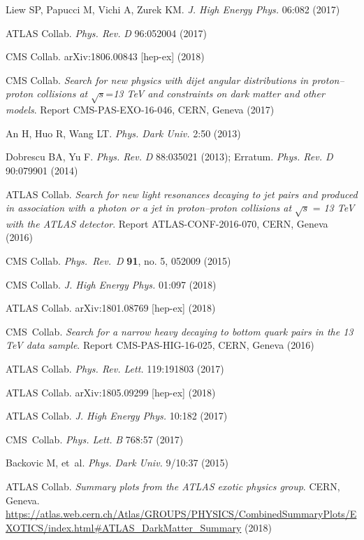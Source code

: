 \documentclass{ar-1col}
\begin{document}
{\begin{thebibliography}{175}
Liew SP, Papucci M, Vichi A, Zurek KM. \textit{J. High Energy Phys.} 06:082 (2017)

{ATLAS Collab}. \textit{Phys. Rev.} \textit{D} 96:052004 (2017)
  
{CMS Collab.} arXiv:1806.00843 [hep-ex] (2018) 

CMS Collab.\textit{ Search for new physics with dijet angular distributions in proton--proton collisions at} $\sqrt{s}$=\textit{13 TeV and constraints on dark matter and other models}. Report CMS-PAS-EXO-16-046, CERN, Geneva (2017)

An H, Huo R, Wang LT. \textit{Phys. Dark Univ.} 2:50 (2013)

Dobrescu BA, Yu F. \textit{Phys. Rev.} \textit{D} 88:035021 (2013); Erratum. \textit{Phys. Rev. D} 90:079901 (2014)

{ATLAS Collab}. \textit{Search for new light resonances decaying to jet pairs and produced in association with a photon or a jet in proton--proton collisions at}
$\sqrt{s}$ = \textit{13 TeV with the ATLAS detector}. Report ATLAS-CONF-2016-070, CERN, Geneva (2016)

{CMS Collab}. \textit{Phys.\ Rev.\ D} \textbf{91}, no. 5, 052009 (2015)

{CMS Collab}. \textit{J. High Energy Phys.} 01:097 (2018) 

{ATLAS Collab}. arXiv:1801.08769 [hep-ex] (2018)

{CMS~Collab}. \textit{Search for a narrow heavy decaying to bottom quark pairs in the 13 TeV data sample}.
Report {CMS-PAS-HIG-16-025}, CERN, Geneva (2016)

{ATLAS Collab}. \textit{Phys. Rev. Lett.} 119:191803 (2017)

{ATLAS Collab.} arXiv:1805.09299 [hep-ex] (2018)

{ATLAS Collab}. \textit{J. High Energy Phys.} 10:182 (2017)

{CMS~Collab}. \textit{Phys. Lett.} \textit{B} 768:57 (2017)

Backovic M, et~al. \textit{Phys. Dark Univ.} 9/10:37 (2015)

ATLAS Collab. \textit{Summary plots from the ATLAS exotic
physics group}. CERN, Geneva. \url{https://atlas.web.cern.ch/Atlas/GROUPS/PHYSICS/CombinedSummaryPlots/EXOTICS/index.html#ATLAS_DarkMatter_Summary} (2018)


\end{thebibliography}}
\end{document}
